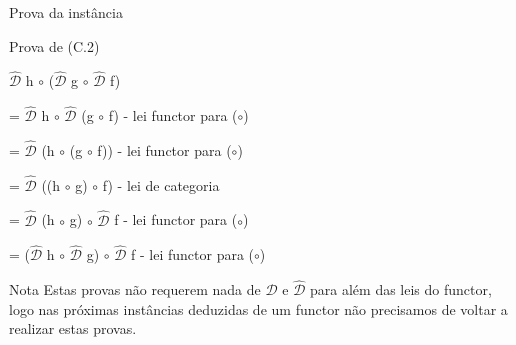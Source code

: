 \documentclass{beamer}
\begin{document}
\begin{frame}{Prova da instância}

\begin{block}{Prova de (C.2)}

$\mathcal{\hat{D}}$ h $\circ$ ($\mathcal{\hat{D}}$ g $\circ$ $\mathcal{\hat{D}}$ f)

= $\mathcal{\hat{D}}$ h $\circ$ $\mathcal{\hat{D}}$ (g $\circ$ f) - lei functor para ($\circ$)

= $\mathcal{\hat{D}}$ (h $\circ$ (g $\circ$ f)) - lei functor para ($\circ$)

= $\mathcal{\hat{D}}$ ((h $\circ$ g) $\circ$ f) - lei de categoria

= $\mathcal{\hat{D}}$ (h $\circ$ g) $\circ$ $\mathcal{\hat{D}}$  f - lei functor para ($\circ$)

= ($\mathcal{\hat{D}}$ h $\circ$ $\mathcal{\hat{D}}$ g) $\circ$ $\mathcal{\hat{D}}$ f - lei functor para ($\circ$)

\end{block}

\begin{alertblock}{Nota}
Estas provas não requerem nada de $\mathcal{D}$ e $\mathcal{\hat{D}}$ para além das leis do functor, logo nas próximas instâncias deduzidas de um functor não precisamos de voltar a realizar estas provas.

\end{alertblock}

\end{frame}
\end{document}
